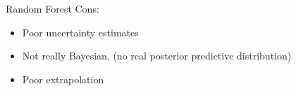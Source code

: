 \documentclass[11pt,compress,t,notes=noshow, xcolor=table]{beamer}
\begin{document}
\begin{frame}{Random Forest}
Cons:
\begin{itemize}
  \item Poor uncertainty estimates
  \item Not really Bayesian, (no real posterior predictive distribution)
  \item Poor extrapolation
\end{itemize}
 
\end{frame}

\endlecture
\end{document}

